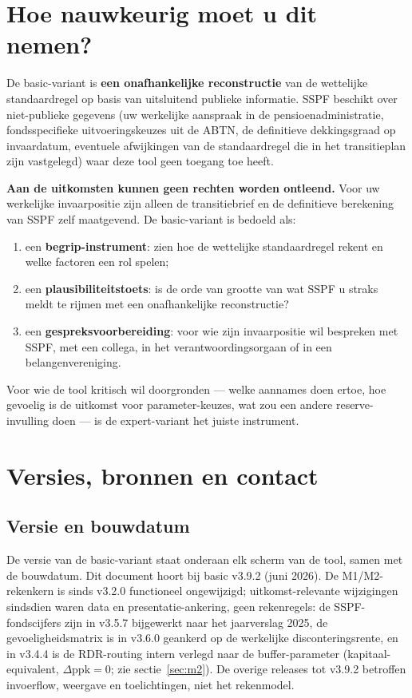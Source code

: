 \documentclass[11pt,a4paper]{article}
\begin{document}
\section{Hoe nauwkeurig moet u dit nemen?}

De basic-variant is \textbf{een onafhankelijke reconstructie} van de wettelijke standaardregel op basis van uitsluitend publieke informatie. SSPF beschikt over niet-publieke gegevens (uw werkelijke aanspraak in de pensioenadministratie, fondsspecifieke uitvoeringskeuzes uit de ABTN, de definitieve dekkingsgraad op invaardatum, eventuele afwijkingen van de standaardregel die in het transitieplan zijn vastgelegd) waar deze tool geen toegang toe heeft.

\textbf{Aan de uitkomsten kunnen geen rechten worden ontleend.} Voor uw werkelijke invaarpositie zijn alleen de transitiebrief en de definitieve berekening van SSPF zelf maatgevend. De basic-variant is bedoeld als:

\begin{enumerate}
\item een \textbf{begrip-instrument}: zien hoe de wettelijke standaardregel rekent en welke factoren een rol spelen;
\item een \textbf{plausibiliteitstoets}: is de orde van grootte van wat SSPF u straks meldt te rijmen met een onafhankelijke reconstructie?
\item een \textbf{gespreksvoorbereiding}: voor wie zijn invaarpositie wil bespreken met SSPF, met een collega, in het verantwoordingsorgaan of in een belangenvereniging.
\end{enumerate}

Voor wie de tool kritisch wil doorgronden --- welke aannames doen ertoe, hoe gevoelig is de uitkomst voor parameter-keuzes, wat zou een andere reserve-invulling doen --- is de expert-variant het juiste instrument.

\section{Versies, bronnen en contact}

\subsection{Versie en bouwdatum}

De versie van de basic-variant staat onderaan elk scherm van de tool, samen met de bouwdatum. Dit document hoort bij basic v3.9.2 (juni 2026). De M1/M2-rekenkern is sinds v3.2.0 functioneel ongewijzigd; uitkomst-relevante wijzigingen sindsdien waren data en presentatie-ankering, geen rekenregels: de SSPF-fondscijfers zijn in v3.5.7 bijgewerkt naar het jaarverslag 2025, de gevoeligheidsmatrix is in v3.6.0 geankerd op de werkelijke disconteringsrente, en in v3.4.4 is de RDR-routing intern verlegd naar de buffer-parameter (kapitaal-equivalent, $\Delta\text{ppk} = 0$; zie sectie~\ref{sec:m2}). De overige releases tot v3.9.2 betroffen invoerflow, weergave en toelichtingen, niet het rekenmodel.
\end{document}

